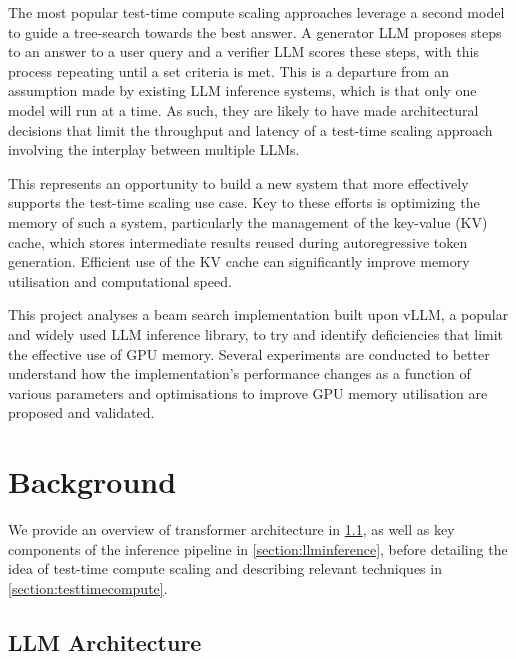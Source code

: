 \documentclass[11pt,twoside]{report}
\begin{document}
The most popular test-time compute scaling approaches leverage a second model to guide a tree-search towards the best answer.
A generator LLM proposes steps to an answer to a user query and a verifier LLM scores these steps, with this process repeating until a set criteria is met. 
This is a departure from an assumption made by existing LLM inference systems, which is that only one model will run at a time.
As such, they are likely to have made architectural decisions that limit the throughput and latency of a test-time scaling approach involving the interplay between multiple LLMs.

This represents an opportunity to build a new system that more effectively supports the test-time scaling use case.
Key to these efforts is optimizing the memory of such a system, particularly the management of the key-value (KV) cache, which stores intermediate results reused during autoregressive token generation. 
Efficient use of the KV cache can significantly improve memory utilisation and computational speed.

This project analyses a beam search implementation built upon vLLM, a popular and widely used LLM inference library, to try and identify deficiencies that limit the effective use of GPU memory. 
Several experiments are conducted to better understand how the implementation's performance changes as a function of various parameters and optimisations to improve GPU memory utilisation are proposed and validated. 


\chapter{Background} %
We provide an overview of transformer architecture in \ref{section:llmarchitecture}, as well as key components of the inference pipeline in \ref{section:llminference}, before detailing the idea of test-time compute scaling and describing relevant techniques in \ref{section:testtimecompute}.
\section{LLM Architecture}\label{section:llmarchitecture}
\end{document}
